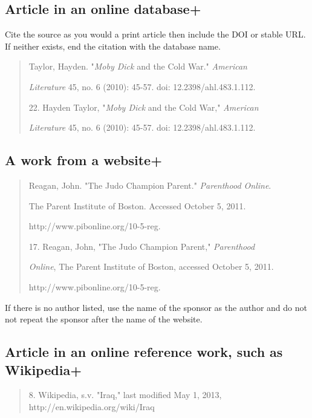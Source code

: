 \subsection{Article in an online database+}
Cite the source as you would a print article then include the DOI or stable URL. If neither exists, end the
citation with the database name.

\begin{quote}
Taylor, Hayden. "\emph{Moby Dick} and the Cold War." \emph{American}

\hspace{.4in}\emph{Literature} 45, no. 6 (2010): 45-57. doi: 12.2398/ahl.483.1.112.

\medskip

\hspace{.4in}22. Hayden Taylor, "\emph{Moby Dick} and the Cold War," \emph{American} 

\emph{Literature} 45, no. 6 (2010): 45-57. doi: 12.2398/ahl.483.1.112.
\end{quote}

\subsection{A work from a website+}

\begin{quote}

Reagan, John. "The Judo Champion Parent." \emph{Parenthood Online}. 

\hspace{.4in}The Parent Institute of Boston. Accessed October 5, 2011. 

\hspace{.4in}http://www.pibonline.org/10-5-reg.

\medskip

\hspace{.4in}17. Reagan, John, "The Judo Champion Parent," \emph{Parenthood}

\emph{Online}, The Parent Institute of Boston, accessed October 5, 2011. 

http://www.pibonline.org/10-5-reg.
\end{quote}

 If there is no author listed, use the name of the sponsor as the author and do not 
not repeat the sponsor after the name of the website.

\subsection{Article in an online reference work, such as Wikipedia+}
\begin{quote}

\hspace{.4in}8. Wikipedia, s.v. "Iraq," last modified May 1, 2013, http://en.wikipedia.org/wiki/Iraq

\end{quote}

